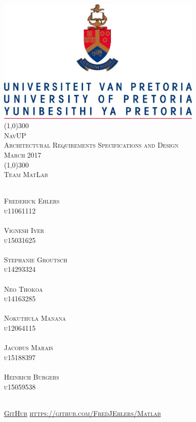 \documentclass[runningheads,a4paper]{article}
\begin{document}
\begin{titlepage}
\begin{center}
\includegraphics[width=10cm]{UP.jpg}  \\
[1cm]
\line(1,0){300} \\
[0.3cm]
\textsc{\Large
NavUP \\
Architectural Requirements Specifications and Design \\
\hfill {} March 2017
}\\
[0.1cm]
\line(1,0){300} \\
[0.7cm]
\textsc{\Large
Team MatLab
} \\
\end{center}
\begin{center}
\begin{multicols}{2}
\textsc{\large\\
Frederick Ehlers\\ 
u11061112\\ 
}
\textsc{\large\\
Vignesh Iyer\\
u15031625\\ 
}
\textsc{\large\\
Stephanie Groutsch\\
u14293324\\ 
}
\textsc{\large\\
Neo Thokoa\\
u14163285\\
}
\columnbreak
\textsc{\large\\
Nokuthula Manana\\
u12064115\\
}
\textsc{\large\\
Jacobus Marais\\
u15188397\\
}
\textsc{\large\\
Heinrich Burgers\\
u15059538\\
}
\end{multicols}
\textsc{	\\ \href{https://github.com/FredJEhlers/Matlab}{GitHub}
\url{https://github.com/FredJEhlers/Matlab}}
\end{center}
\end{titlepage}
\end{document}
